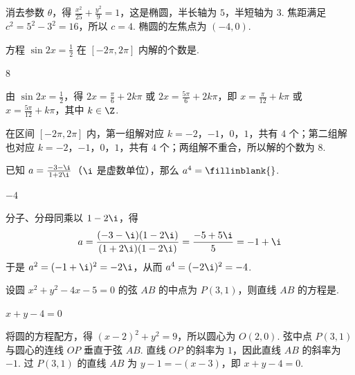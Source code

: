 \documentclass[UTF8,a4paper,oneside,11pt]{ctexbook}
\begin{document}
\begin{solution}
消去参数 \(\theta\)，得
\(\frac{x^2}{25}+\frac{y^2}{9}=1\)，这是椭圆，半长轴为 \(5\)，半短轴为 \(3\). 焦距满足 \(c^2=5^2-3^2=16\)，所以 \(c=4\). 椭圆的左焦点为 \((-4,0)\).
\end{solution}

\begin{problem}
方程 \(\sin 2x = \frac{1}{2}\) 在 \(\left[-2\pi, 2\pi\right]\) 内解的个数是\fillinblank{}.
\end{problem}

\begin{answer}
8
\end{answer}

\begin{solution}
由 \(\sin 2x=\frac12\)，得
\(2x=\frac{\pi}{6}+2k\pi\) 或 \(2x=\frac{5\pi}{6}+2k\pi\)，即
\(x=\frac{\pi}{12}+k\pi\) 或 \(x=\frac{5\pi}{12}+k\pi\)，其中 \(k\in\Z\).

在区间 \([-2\pi,2\pi]\) 内，第一组解对应 \(k=-2\)，\(-1\)，\(0\)，\(1\)，共有 \(4\) 个；第二组解也对应 \(k=-2\)，\(-1\)，\(0\)，\(1\)，共有 \(4\) 个；两组解不重合，所以解的个数为 \(8\).
\end{solution}

\begin{problem}
已知 \(a=\frac{-3-\i}{1+2\i}\)（\(\i\) 是虚数单位），那么 \(a^4=\fillinblank{}\).
\end{problem}

\begin{answer}
\(-4\)
\end{answer}

\begin{solution}
分子、分母同乘以 \(1-2\i\)，得
\[
a=\frac{(-3-\i)(1-2\i)}{(1+2\i)(1-2\i)}=\frac{-5+5\i}{5}=-1+\i
\]
于是 \(a^2=(-1+\i)^2=-2\i\)，从而
\(a^4=(-2\i)^2=-4\).
\end{solution}

\begin{problem}
设圆 \(x^2+y^2-4x-5=0\) 的弦 \(AB\) 的中点为 \(P(3,1)\)，则直线 \(AB\) 的方程是\fillinblank{}.
\end{problem}

\begin{answer}
\(x+y-4=0\)
\end{answer}

\begin{solution}
将圆的方程配方，得 \((x-2)^2+y^2=9\)，所以圆心为 \(O(2,0)\). 弦中点 \(P(3,1)\) 与圆心的连线 \(OP\) 垂直于弦 \(AB\). 直线 \(OP\) 的斜率为 \(1\)，因此直线 \(AB\) 的斜率为 \(-1\). 过 \(P(3,1)\) 的直线 \(AB\) 为
\(y-1=-(x-3)\)，即 \(x+y-4=0\).
\end{solution}
\end{document}
